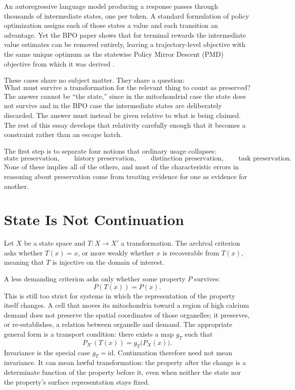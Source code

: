 \documentclass[11pt]{article}
\theoremstyle{remark}
\begin{document}
An autoregressive language model producing a response passes through thousands of intermediate states, one per token. A standard formulation of policy optimization assigns each of those states a value and each transition an advantage. Yet the BPO paper shows that for terminal rewards the intermediate value estimates can be removed entirely, leaving a trajectory-level objective with the same unique optimum as the statewise Policy Mirror Descent (PMD) objective from which it was derived \cite{bpo}.

These cases share no subject matter. They share a question:
\[
\boxed{\text{What must survive a transformation for the relevant thing to count as preserved?}}
\]
The answer cannot be ``the state,'' since in the mitochondrial case the state does not survive and in the BPO case the intermediate states are deliberately discarded. The answer must instead be given relative to what is being claimed. The rest of this essay develops that relativity carefully enough that it becomes a constraint rather than an escape hatch.

The first step is to separate four notions that ordinary usage collapses:
\[
\text{state preservation},\qquad
\text{history preservation},\qquad
\text{distinction preservation},\qquad
\text{task preservation}.
\]
None of these implies all of the others, and most of the characteristic errors in reasoning about preservation come from treating evidence for one as evidence for another.

\section{State Is Not Continuation}

Let $X$ be a state space and $T:X\to X'$ a transformation. The archival criterion asks whether $T(x)=x$, or more weakly whether $x$ is recoverable from $T(x)$, meaning that $T$ is injective on the domain of interest.

A less demanding criterion asks only whether some property $P$ survives:
\[
P(T(x)) = P(x).
\]
This is still too strict for systems in which the representation of the property itself changes. A cell that moves its mitochondria toward a region of high calcium demand does not preserve the spatial coordinates of those organelles; it preserves, or re-establishes, a relation between organelle and demand. The appropriate general form is a transport condition: there exists a map $g_T$ such that
\[
P_{X'}(T(x)) = g_T\bigl(P_X(x)\bigr).
\]
Invariance is the special case $g_T=\mathrm{id}$. Continuation therefore need not mean invariance. It can mean lawful transformation: the property after the change is a determinate function of the property before it, even when neither the state nor the property's surface representation stays fixed.
\end{document}
